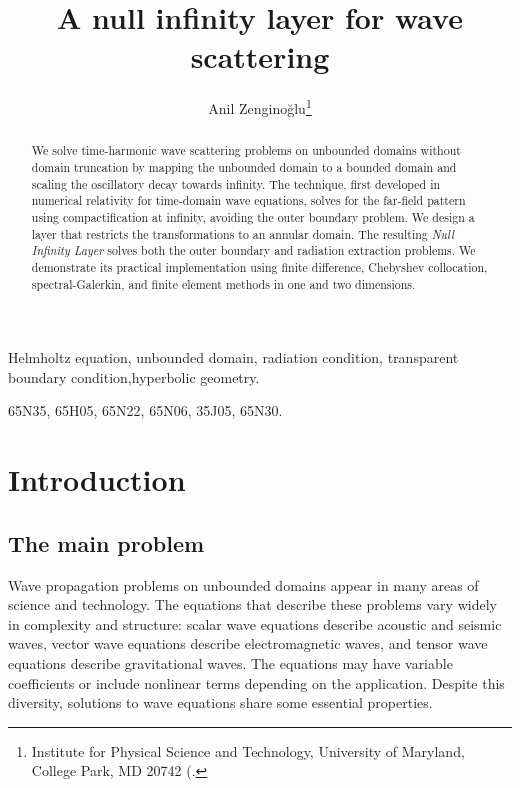 \documentclass[onefignum,onetabnum]{siamart190516}
\title{A null infinity layer for wave scattering}
\author{Anil Zengino\u{g}lu\thanks{Institute for Physical Science and Technology, University of Maryland, College Park, MD 20742
  (\email{anil@umd.edu)}.}}
\date{}
\begin{document}
\linenumbers %

\maketitle

\begin{abstract}
We solve time-harmonic wave scattering problems on unbounded domains without domain truncation by mapping the unbounded domain to a bounded domain and scaling the oscillatory decay towards infinity. The technique, first developed in numerical relativity for time-domain wave equations, solves for the far-field pattern using compactification at infinity, avoiding the outer boundary problem. We design a layer that restricts the transformations to an annular domain. The resulting \emph{Null Infinity Layer} solves both the outer boundary and radiation extraction problems. We demonstrate its practical implementation using finite difference, Chebyshev collocation, spectral-Galerkin, and finite element methods in one and two dimensions. 
\end{abstract}

\begin{keywords}
	Helmholtz equation, unbounded domain, radiation condition, transparent boundary condition,hyperbolic geometry.
\end{keywords}

\begin{AMS}
	65N35, %
	65H05, %
	65N22, %
	65N06, %
	35J05, %
	65N30.
\end{AMS}



\section{Introduction}

\subsection{The main problem}
Wave propagation problems on unbounded domains appear in many areas of science and technology. The equations that describe these problems vary widely in complexity and structure: scalar wave equations describe acoustic and seismic waves, vector wave equations describe electromagnetic waves, and tensor wave equations describe gravitational waves. The equations may have variable coefficients or include nonlinear terms depending on the application. Despite this diversity, solutions to wave equations share some essential properties.
\end{document}
